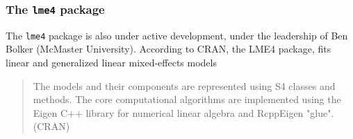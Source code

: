 \documentclass[12pt, a4paper]{report}
\theoremstyle{plain}
\theoremstyle{definition}
\theoremstyle{remark}
\begin{document}
\subsubsection*{The \texttt{lme4} package}

The \texttt{lme4} package is also under active development, under the leadership of Ben Bolker (McMaster University). According to CRAN, the LME4 package, fits linear and generalized linear mixed-effects models

\begin{quote}
	The models and their components are represented using S4 classes and methods. The core computational algorithms are implemented using the Eigen C++ library for numerical linear algebra and RcppEigen "glue".
	(CRAN)
\end{quote}


\end{document}
